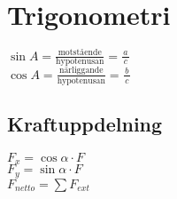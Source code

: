\section{Trigonometri}
\begin{math}
	\sin A=\frac{\textrm{motstående}}{\textrm{hypotenusan}}=\frac{a}{\,c\,}
\end{math} \\[2pt]
\begin{math}
	\cos A=\frac{\textrm{närliggande}}{\textrm{hypotenusan}}=\frac{b}{\,c\,}
\end{math} \\[2pt]

\subsection{Kraftuppdelning}
\begin{math}
    F_x = \cos \alpha \cdot F
\end{math} \\[2pt]
\begin{math}
    F_y = \sin \alpha \cdot F
\end{math} \\[2pt]
\begin{math}
    F_{netto} = \sum F_{ext}
\end{math} \\[2pt]


